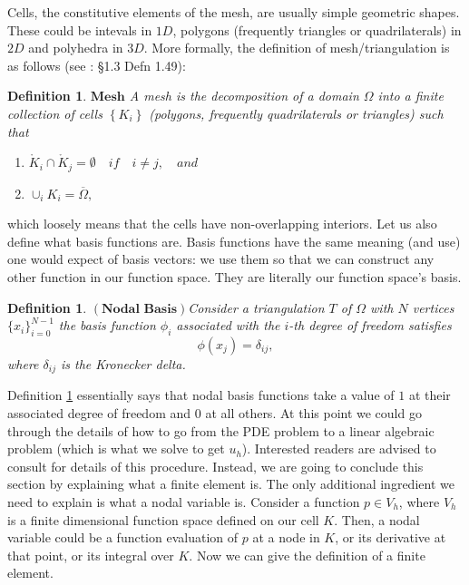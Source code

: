 \documentclass[12pt,a4paper]{article}
\newtheorem{definition}[theorem]{Definition}
\theoremstyle{definition}
\begin{document}
Cells, the constitutive elements of the mesh, are usually simple geometric shapes.  These could be intevals in $1D$, polygons (frequently triangles or quadrilaterals) in $2D$ and polyhedra in $3D$.  More formally, the definition of mesh/triangulation is as follows (see \cite{ern2013theory}: \S 1.3 Defn 1.49): 
\theoremstyle{definition}
\begin{definition}{$\textbf{Mesh}$} 
A mesh is the decomposition of a domain $\Omega$ into a finite collection of cells $\left \lbrace K_i\right\rbrace$ (polygons, frequently quadrilaterals or triangles)  such that
\begin{enumerate}
\item $ \mathring{K}_i \cap \mathring{K}_j = \emptyset\quad if\quad i\neq j,\quad and$
\item $\cup_i K_i = \overline{\Omega},$
\end{enumerate}
\end{definition}
which loosely means that the cells have non-overlapping interiors.   Let us also define what basis functions are.  Basis functions have the same meaning (and use) one would expect of basis vectors: we use them so that we can construct any other function in our function space.  They are literally our function space's basis.  
\begin{definition}{$\left(\textbf{Nodal Basis}\right)$}\label{defn_nodal_basis}
	Consider a triangulation $T$ of $\Omega$ with $N$ vertices $\lbrace x_i\rbrace_{i=0}^{N-1}$ the basis function $\phi_i$ associated with the $i$-th degree of freedom satisfies 
	\begin{equation}
	\phi\left(x_j\right) = \delta_{ij},
	\end{equation}
	where $ \delta_{ij}$ is the Kronecker delta.
\end{definition}
Definition \ref{defn_nodal_basis} essentially says that nodal basis functions take a value of $1$ at their associated degree of freedom and $0$ at all others.
At this point we could go through the details of how to go from the PDE problem to a linear algebraic problem (which is what we solve to get $u_h$).  Interested readers are advised to consult \cite{elman2014finite} for details of this procedure.  Instead, we are going to conclude this section by explaining what a finite element is.  The only additional ingredient we need to explain is what a nodal variable is.  Consider a function $p\in V_h$, where $V_h$ is a finite dimensional function space defined on our cell $K$.  Then, a nodal variable could be a function evaluation of $p$ at a node in $K$, or its derivative at that point, or its integral over $K$.  Now we can give the definition of a finite element.
\end{document}

